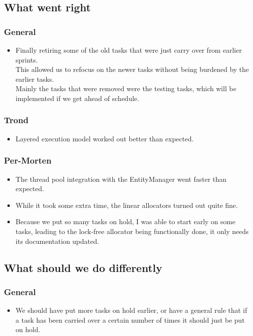 \documentclass{article}
\begin{document}
\subsection*{What went right}
\subsubsection*{General}
\begin{itemize}
    \item
    Finally retiring some of the old tasks that were just carry over from earlier sprints.\\
    This allowed us to refocus on the newer tasks without being burdened by the earlier tasks.\\
    Mainly the tasks that were removed were the testing tasks, which will be implemented if we get ahead of schedule.
\end{itemize}

\subsubsection*{Trond}
\begin{itemize}
    \item 
    Layered execution model worked out better than expected.
\end{itemize}

\subsubsection*{Per-Morten}
\begin{itemize}
    \item
    The thread pool integration with the EntityManager went faster than expected.

    \item
    While it took some extra time, the linear allocators turned out quite fine.

    \item
    Because we put so many tasks on hold, I was able to start early on some tasks,
    leading to the lock-free allocator being functionally done, it only needs its documentation updated.
\end{itemize}


\subsection*{What should we do differently}
\subsubsection*{General}
\begin{itemize}
    \item
    We should have put more tasks on hold earlier, 
    or have a general rule that if a task has been carried over a certain number of times it should just be put on hold.
\end{itemize}
\end{document}
